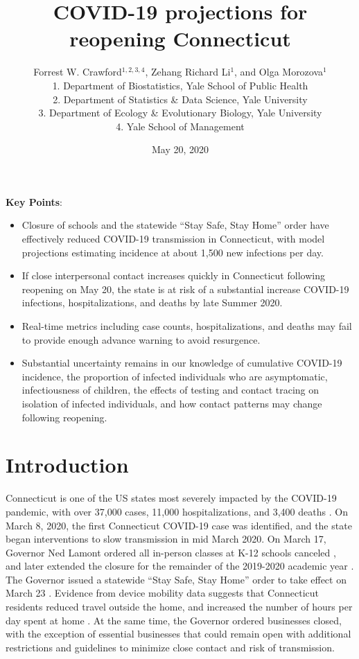 \documentclass[11pt]{article}
\title{COVID-19 projections for reopening Connecticut}
\author{
  Forrest W. Crawford$^{1,2,3,4}$,
  Zehang Richard Li$^1$,
  and
  Olga Morozova$^{1}$
  \\[1em]
\small 1. Department of Biostatistics, Yale School of Public Health \\
\small 2. Department of Statistics \& Data Science, Yale University \\
\small 3. Department of Ecology \& Evolutionary Biology, Yale University \\
\small 4. Yale School of Management }
\date{May 20, 2020}
\begin{document}
\maketitle


\textbf{Key Points}:
\vspace{-0.5em}
\begin{itemize}%
	\setlength\itemsep{0em}
	\setlength\parsep{0em}
	\setlength\topsep{0em}
  \item Closure of schools and the statewide ``Stay Safe, Stay Home'' order have effectively reduced COVID-19 transmission in Connecticut, with model projections estimating incidence at about 1,500 new infections per day.
  \item If close interpersonal contact increases quickly in Connecticut following reopening on May 20, the state is at risk of a substantial increase COVID-19 infections, hospitalizations, and deaths by late Summer 2020.
  \item Real-time metrics including case counts, hospitalizations, and deaths may fail to provide enough advance warning to avoid resurgence.  
  \item Substantial uncertainty remains in our knowledge of cumulative COVID-19 incidence, the proportion of infected individuals who are asymptomatic, infectiousness of children, the effects of testing and contact tracing on isolation of infected individuals, and how contact patterns may change following reopening.  
\end{itemize}



\section*{Introduction}

Connecticut is one of the US states most severely impacted by the COVID-19 pandemic, with over 37,000 cases, 11,000 hospitalizations, and 3,400 deaths \citep{nyt2020Connecticut,atlantic2020data}.  On March 8, 2020, the first Connecticut COVID-19 case was identified, and the state began interventions to slow transmission in mid March 2020.  On March 17, Governor Ned Lamont ordered all in-person classes at K-12 schools canceled \citep{lamont2020exec7c}, and later extended the closure for the remainder of the 2019-2020 academic year \citep{lamont2020exec7l,lamont2020exec7x,lamont2020exec7ii}.  The Governor issued a statewide ``Stay Safe, Stay Home'' order to take effect on March 23 \citep{lamont2020exec7h}.  Evidence from device mobility data suggests that Connecticut residents reduced travel outside the home, and increased the number of hours per day spent at home \citep{google2020covid,facebook2020covid}. At the same time, the Governor ordered businesses closed, with the exception of essential businesses that could remain open with additional restrictions and guidelines to minimize close contact and risk of transmission. 
\end{document}
